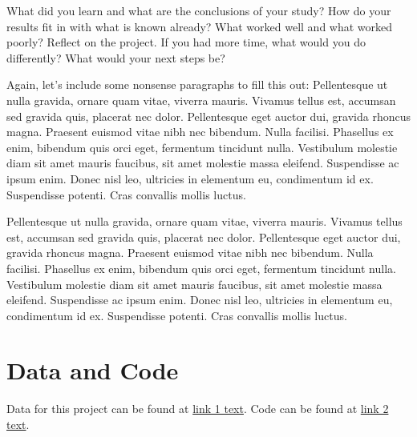 \documentclass[10pt,twocolumn,superscriptaddress,notitlepage]{revtex4-1}
\begin{document}
What did you learn and what are the conclusions of your study?  How do your results fit in with what is known already?  What worked well and what worked poorly? Reflect on the project.  If you had more time, what would you do differently? What would your next steps be? 

Again, let's include some nonsense paragraphs to fill this out:  Pellentesque ut nulla gravida, ornare quam vitae, viverra mauris. Vivamus tellus est, accumsan sed gravida quis, placerat nec dolor. Pellentesque eget auctor dui, gravida rhoncus magna. Praesent euismod vitae nibh nec bibendum. Nulla facilisi. Phasellus ex enim, bibendum quis orci eget, fermentum tincidunt nulla. Vestibulum molestie diam sit amet mauris faucibus, sit amet molestie massa eleifend. Suspendisse ac ipsum enim. Donec nisl leo, ultricies in elementum eu, condimentum id ex. Suspendisse potenti. Cras convallis mollis luctus.

Pellentesque ut nulla gravida, ornare quam vitae, viverra mauris. Vivamus tellus est, accumsan sed gravida quis, placerat nec dolor. Pellentesque eget auctor dui, gravida rhoncus magna. Praesent euismod vitae nibh nec bibendum. Nulla facilisi. Phasellus ex enim, bibendum quis orci eget, fermentum tincidunt nulla. Vestibulum molestie diam sit amet mauris faucibus, sit amet molestie massa eleifend. Suspendisse ac ipsum enim. Donec nisl leo, ultricies in elementum eu, condimentum id ex. Suspendisse potenti. Cras convallis mollis luctus.

\section{Data and Code}

Data for this project can be found at \href{http://www.google.com}{link 1 text}. 
Code can be found at \href{http://www.github.com}{link 2 text}.





\end{document}
